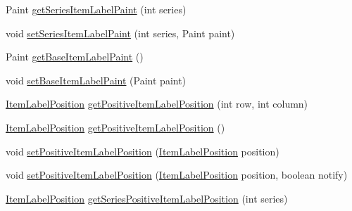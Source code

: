 \begin{DoxyCompactItemize}
\item 
Paint \mbox{\hyperlink{interfaceorg_1_1jfree_1_1chart_1_1renderer_1_1category_1_1_category_item_renderer_a781dce45cf2ee87d6d891809ef826852}{get\+Series\+Item\+Label\+Paint}} (int series)
\item 
void \mbox{\hyperlink{interfaceorg_1_1jfree_1_1chart_1_1renderer_1_1category_1_1_category_item_renderer_a5073e180fe38cae12d94d539796f7a29}{set\+Series\+Item\+Label\+Paint}} (int series, Paint paint)
\item 
Paint \mbox{\hyperlink{interfaceorg_1_1jfree_1_1chart_1_1renderer_1_1category_1_1_category_item_renderer_a7235637c78c4be2e7cf0a2d46e03a034}{get\+Base\+Item\+Label\+Paint}} ()
\item 
void \mbox{\hyperlink{interfaceorg_1_1jfree_1_1chart_1_1renderer_1_1category_1_1_category_item_renderer_a51d5ebfa3ec0fa1b1ed5ab9ac945c211}{set\+Base\+Item\+Label\+Paint}} (Paint paint)
\item 
\mbox{\hyperlink{classorg_1_1jfree_1_1chart_1_1labels_1_1_item_label_position}{Item\+Label\+Position}} \mbox{\hyperlink{interfaceorg_1_1jfree_1_1chart_1_1renderer_1_1category_1_1_category_item_renderer_a7566a573fae7300d41c2448cf9fac027}{get\+Positive\+Item\+Label\+Position}} (int row, int column)
\item 
\mbox{\hyperlink{classorg_1_1jfree_1_1chart_1_1labels_1_1_item_label_position}{Item\+Label\+Position}} \mbox{\hyperlink{interfaceorg_1_1jfree_1_1chart_1_1renderer_1_1category_1_1_category_item_renderer_a7638a57b47286a431b6f48b756b32ebc}{get\+Positive\+Item\+Label\+Position}} ()
\item 
void \mbox{\hyperlink{interfaceorg_1_1jfree_1_1chart_1_1renderer_1_1category_1_1_category_item_renderer_a5c8f5ce5838f1665ccea46f50e507c0d}{set\+Positive\+Item\+Label\+Position}} (\mbox{\hyperlink{classorg_1_1jfree_1_1chart_1_1labels_1_1_item_label_position}{Item\+Label\+Position}} position)
\item 
void \mbox{\hyperlink{interfaceorg_1_1jfree_1_1chart_1_1renderer_1_1category_1_1_category_item_renderer_a017635014dbee7dfdb4f67ad79a10e18}{set\+Positive\+Item\+Label\+Position}} (\mbox{\hyperlink{classorg_1_1jfree_1_1chart_1_1labels_1_1_item_label_position}{Item\+Label\+Position}} position, boolean notify)
\item 
\mbox{\hyperlink{classorg_1_1jfree_1_1chart_1_1labels_1_1_item_label_position}{Item\+Label\+Position}} \mbox{\hyperlink{interfaceorg_1_1jfree_1_1chart_1_1renderer_1_1category_1_1_category_item_renderer_aa8bb0c1b20139707cb336afc9bed9b78}{get\+Series\+Positive\+Item\+Label\+Position}} (int series)

\end{DoxyCompactItemize}
